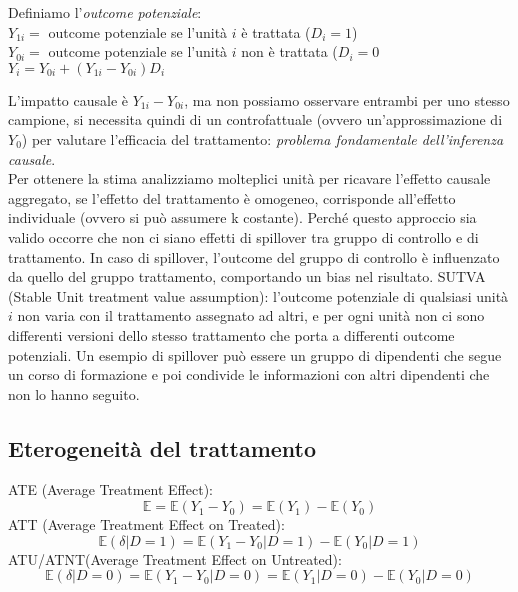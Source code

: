 Definiamo l'\textit{outcome potenziale}:
\\$Y_{1i}=$ outcome potenziale se l'unità $i$ è trattata ($D_i = 1$)
\\$Y_{0i}=$ outcome potenziale se l'unità $i$ non è trattata ($D_i = 0$
\\$Y_i = Y_{0i} + (Y_{1i} - Y_{0i})D_i$

L'impatto causale è $Y_{1i} - Y_{0i}$, ma non possiamo osservare entrambi per uno stesso campione,
si necessita quindi di un controfattuale (ovvero un'approssimazione di $Y_0$) per valutare 
l'efficacia del trattamento: \textit{problema fondamentale dell'inferenza causale}.
\\Per ottenere la stima analizziamo molteplici unità per ricavare l'effetto causale aggregato,
se l'effetto del trattamento è omogeneo, corrisponde all'effetto individuale (ovvero si può
assumere k costante).
Perché questo approccio sia valido occorre che non ci siano effetti di spillover tra gruppo 
di controllo e di trattamento. In caso di spillover, l’outcome del gruppo di controllo è 
influenzato da quello del gruppo trattamento, comportando un bias nel risultato.
SUTVA (Stable Unit treatment value assumption): l’outcome potenziale di qualsiasi unità $i$ 
non varia con il trattamento assegnato ad altri, e per ogni unità non ci sono differenti 
versioni dello stesso trattamento che porta a differenti outcome potenziali.
Un esempio di spillover può essere un gruppo di dipendenti che segue un corso di formazione
e poi condivide le informazioni con altri dipendenti che non lo hanno seguito.
\subsection{Eterogeneità del trattamento}
ATE (Average Treatment Effect):
\begin{equation}
   \mathbb E = \mathbb E(Y_1 - Y_0) = \mathbb E(Y_1) - \mathbb E(Y_0)
\end{equation}
ATT (Average Treatment Effect on Treated):
\begin{equation}
   \mathbb E(\delta|D=1) = \mathbb E(Y_1-Y_0|D=1) - \mathbb E(Y_0|D=1)
\end{equation}
ATU/ATNT(Average Treatment Effect on Untreated):
\begin{equation}
   \mathbb E(\delta|D=0) = \mathbb E(Y_1-Y_0|D=0) = \mathbb E(Y_1|D=0) - \mathbb E (Y_0|D=0)
\end{equation}

